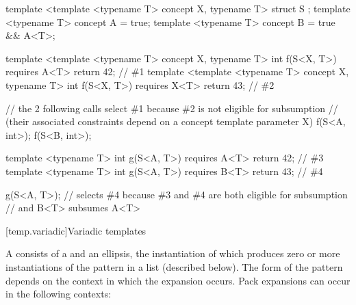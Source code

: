 \documentclass{wg21}
\begin{document}
\begin{addedblock}
\begin{example}
    \begin{codeblock}
        template <template <typename T> concept X, typename T>
        struct S {};
        template <typename T>
        concept A = true;
        template <typename T>
        concept B = true && A<T>;

        template <template <typename T>  concept X, typename T>
        int f(S<X, T>) requires A<T> { return 42; } // \#1
        template <template <typename T> concept X, typename T>
        int f(S<X, T>) requires X<T> { return 43; } // \#2

        // the 2 following calls select \#1 because \#2 is not eligible for subsumption
        // (their associated constraints depend on a concept template parameter X)
        f(S<A, int>{});
        f(S<B, int>{});

        template <typename T>
        int g(S<A, T>) requires A<T> { return 42; } // \#3
        template <typename T>
        int g(S<A, T>) requires B<T> { return 43; } // \#4

        g(S<A, T>{}); // selects \#4 because \#3 and \#4 are both eligible for subsumption
        // and B<T> subsumes A<T>

    \end{codeblock}
\end{example}
\end{addedblock}

[temp.variadic]{Variadic templates}

\pnum
{}%
A 
consists of a  and an ellipsis, the instantiation of which
produces zero or more instantiations of the pattern in a list (described below).
The form of the pattern
depends on the context in which the expansion occurs. Pack
expansions can occur in the following contexts:
\end{document}
